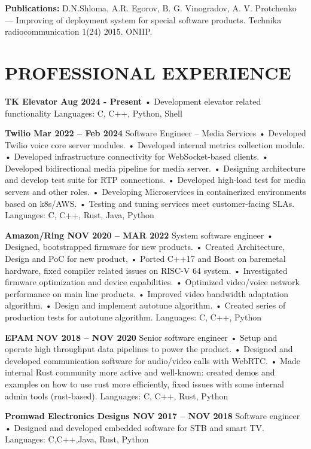 \documentclass{article}
\begin{document}
\bigskip\noindent
\textbf{Publications:}
D.N.Shloma, A.R. Egorov, B. G. Vinogradov, A. V. Protchenko — Improving of deployment
system for special software products. Technika radiocommunication 1(24) 2015. ONIIP.

\section{\textsf{PROFESSIONAL EXPERIENCE}}
\textbf{TK Elevator Aug 2024 - Present}
• Development elevator related functionality
Languages: C, C++, Python, Shell

\bigskip\noindent
\textbf{Twilio Mar 2022 – Feb 2024}
Software Engineer – Media Services
• Developed Twilio voice core server modules.
• Developed internal metrics collection module.
• Developed infrastructure connectivity for WebSocket-based clients.
• Developed bidirectional media pipeline for media server.
• Designing architecture and develop test suite for RTP connections.
• Developed high-load test for media servers and other roles.
• Developing Microservices in containerized environments based on k8s/AWS.
• Testing and tuning services meet customer-facing SLAs.
Languages: C, C++, Rust, Java, Python

\bigskip\noindent
\textbf{Amazon/Ring NOV 2020 – MAR 2022}
System software engineer
• Designed, bootstrapped firmware for new products.
• Created Architecture, Design and PoC for new product,
• Ported C++17 and Boost on baremetal hardware, fixed compiler related issues on RISC-V 64 system.
• Investigated firmware optimization and device capabilities.
• Optimized video/voice network performance on main line products.
• Improved video bandwidth adaptation algorithm.
• Design and implement autotune algorithm.
• Created series of production tests for autotune algorithm.
Languages: C, C++, Python

\bigskip\noindent
\textbf{EPAM NOV 2018 – NOV 2020}
Senior software engineer
• Setup and operate high throughput data pipelines to power the product.
• Designed and developed communication software for audio/video calls with WebRTC.
• Made internal Rust community more active and well-known: created demos and examples on how to use rust
more efficiently, fixed issues with some internal admin tools (rust-based).
Languages: C, C++, Rust, Python

\bigskip\noindent
\textbf{Promwad Electronics Designs NOV 2017 – NOV 2018}
Software engineer
• Designed and developed embedded software for STB and smart TV.
Languages: C,C++,Java, Rust, Python
\end{document}
